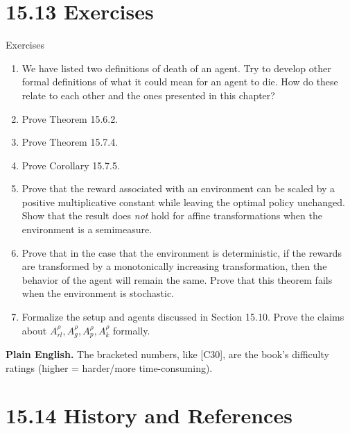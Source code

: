 \documentclass[aspectratio=169,10pt]{beamer}
\begin{document}
\section{15.13 Exercises}

\begin{frame}{Exercises}
  \begin{enumerate}
    \small
    \item[1.] [C30] We have listed two definitions of death of an agent.
      Try to develop other formal definitions of what it could mean for
      an agent to die. How do these relate to each other and the ones
      presented in this chapter?
    \item[2.] [C12] Prove Theorem 15.6.2.
    \item[3.] [C15] Prove Theorem 15.7.4.
    \item[4.] [C11] Prove Corollary 15.7.5.
    \item[5.] [C14] Prove that the reward associated with an environment
      can be scaled by a positive multiplicative constant while leaving
      the optimal policy unchanged. Show that the result does \emph{not}
      hold for affine transformations when the environment is a
      semimeasure.
    \item[6.] [C15] Prove that in the case that the environment is
      deterministic, if the rewards are transformed by a monotonically
      increasing transformation, then the behavior of the agent will
      remain the same. Prove that this theorem fails when the environment
      is stochastic.
    \item[7.] [C32] Formalize the setup and agents discussed in Section
      15.10. Prove the claims about $A^\rho_{rl},A^\rho_g,A^\rho_p,A^\rho_k$
      formally.
  \end{enumerate}
  \textbf{Plain English.} The bracketed numbers, like [C30], are the
  book's difficulty ratings (higher = harder/more time-consuming).
\end{frame}

\section{15.14 History and References}
\end{document}
